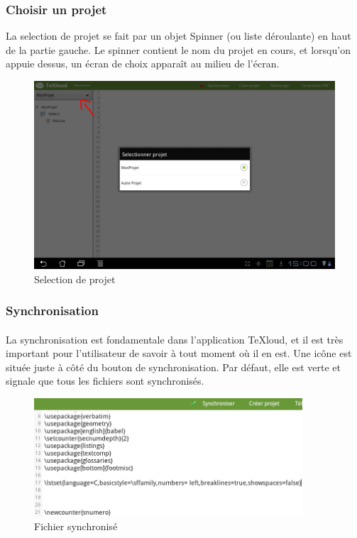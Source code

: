 \documentclass[a4paper,12pt]{article}
\begin{document}
\subsubsection{Choisir un projet}
\bigskip
La selection de projet se fait par un objet Spinner (ou liste déroulante) en haut de la partie gauche. Le spinner contient le nom du projet en cours, et lorsqu'on appuie dessus, un écran de choix apparaît au milieu de l'écran.
\begin{figure}[!ht]
\begin{center}
  \includegraphics[width=1\textwidth]{./images/screenshot/android_selectProject.png}
\end{center}
  \caption{Selection de projet}
  \label{Selection de projet}
\end{figure}

\newpage
\subsubsection{Synchronisation}

\paragraph*{}
La synchronisation est fondamentale dans l'application TeXloud, et il est très important pour l'utilisateur de savoir à tout moment où il en est. Une icône est située juste à côté du bouton de synchronisation. Par défaut, elle est verte et signale que tous les fichiers sont synchronisés.
\begin{figure}[!ht]
\begin{center}
  \includegraphics[width=10cm]{./images/screenshot/synchro1_android.png}
\end{center}
  \caption{Fichier synchronisé}
  \label{Fichier synchronisé}
\end{figure}
\end{document}
